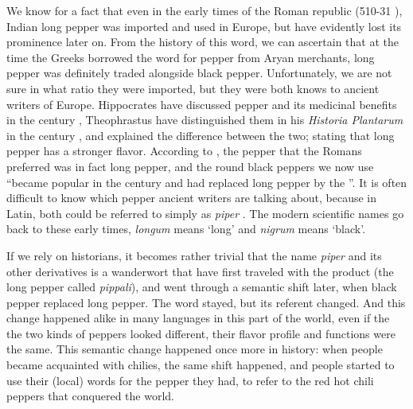 We know for a fact that even in the early times of the Roman republic (510-31 \BC{}), Indian long pepper was imported and used in Europe, but have evidently lost its prominence later on. From the history of this word, we can ascertain that at the time the Greeks borrowed the word for pepper from Aryan merchants, long pepper was definitely traded alongside black pepper. Unfortunately, we are not sure in what ratio they were imported, but they were both knows to ancient writers of Europe. Hippocrates have discussed pepper and its medicinal benefits in the  century \BC{}, Theophrastus have distinguished them in his \textit{Historia Plantarum} in the  century \BC{}, and explained the difference between the two; stating that long pepper has a stronger flavor. According to \textcite{toussaint-samat_history_2009}, the pepper that the Romans preferred was in fact long pepper, and the round black peppers we now use ``became popular in the  century and had replaced long pepper by the ''. It is often difficult to know which pepper ancient writers are talking about, because in Latin, both could be referred to simply as \textit{piper} \autocite[442-443]{toussaint-samat_history_2009}. The modern scientific names go back to these early times, \textit{longum} means `long' and \textit{nigrum} means `black'. 

If we rely on historians, it becomes rather trivial that the name \textit{piper} and its other derivatives is a \gls{wanderwort} that have first traveled with the product (the long pepper called \textit{pippali}), and went through a semantic shift later, when black pepper replaced long pepper. The word stayed, but its referent changed. And this change happened alike in many languages in this part of the world, even if the the two kinds of peppers looked different, their flavor profile and functions were the same. This semantic change happened once more in history: when people became acquainted with chilies, the same shift happened, and people started to use their (local) words for the pepper they had, to refer to the red hot chili peppers that conquered the world.



